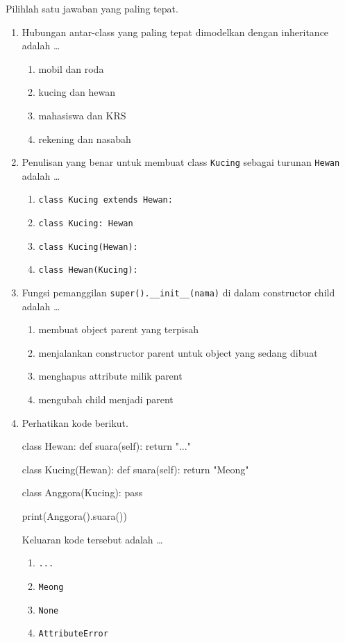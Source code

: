 Pilihlah satu jawaban yang paling tepat.

\begin{enumerate}
  \item Hubungan antar-class yang paling tepat dimodelkan dengan inheritance adalah \ldots
  \begin{enumerate}[label=\alph*.,itemsep=0pt]
    \item mobil dan roda
    \item kucing dan hewan
    \item mahasiswa dan KRS
    \item rekening dan nasabah
  \end{enumerate}

  \item Penulisan yang benar untuk membuat class \texttt{Kucing} sebagai turunan \texttt{Hewan} adalah \ldots
  \begin{enumerate}[label=\alph*.,itemsep=0pt]
    \item \texttt{class Kucing extends Hewan:}
    \item \texttt{class Kucing: Hewan}
    \item \texttt{class Kucing(Hewan):}
    \item \texttt{class Hewan(Kucing):}
  \end{enumerate}

  \item Fungsi pemanggilan \texttt{super().\_\_init\_\_(nama)} di dalam constructor child adalah \ldots
  \begin{enumerate}[label=\alph*.,itemsep=0pt]
    \item membuat object parent yang terpisah
    \item menjalankan constructor parent untuk object yang sedang dibuat
    \item menghapus attribute milik parent
    \item mengubah child menjadi parent
  \end{enumerate}

  \item Perhatikan kode berikut.
\begin{kode}[Soal 4]
class Hewan:
    def suara(self):
        return "..."

class Kucing(Hewan):
    def suara(self):
        return "Meong"

class Anggora(Kucing):
    pass

print(Anggora().suara())
\end{kode}
  Keluaran kode tersebut adalah \ldots
  \begin{enumerate}[label=\alph*.,itemsep=0pt]
    \item \texttt{...}
    \item \texttt{Meong}
    \item \texttt{None}
    \item \texttt{AttributeError}
  \end{enumerate}


\end{enumerate}
